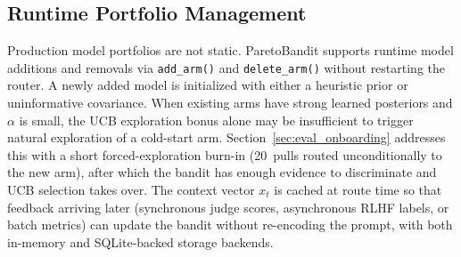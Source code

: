 \subsection{Runtime Portfolio Management}
\label{sec:production_infra}

Production model portfolios are not static. ParetoBandit supports runtime model additions and removals via \texttt{add\_arm()} and \texttt{delete\_arm()} without restarting the router. A newly added model is initialized with either a heuristic prior or uninformative covariance. When existing arms have strong learned posteriors and $\alpha$ is small, the UCB exploration bonus alone may be insufficient to trigger natural exploration of a cold-start arm. Section~\ref{sec:eval_onboarding} addresses this with a short forced-exploration burn-in (20~pulls routed unconditionally to the new arm), after which the bandit has enough evidence to discriminate and UCB selection takes over. The context vector $x_t$ is cached at route time so that feedback arriving later (synchronous judge scores, asynchronous RLHF labels, or batch metrics) can update the bandit without re-encoding the prompt, with both in-memory and SQLite-backed storage backends.
